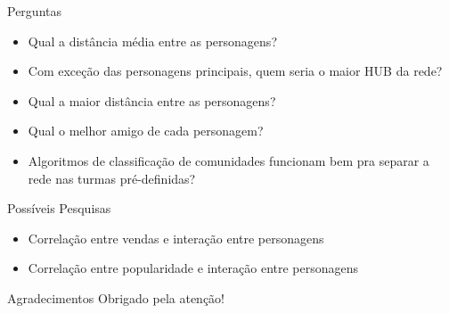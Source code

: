 \documentclass{beamer}
\begin{document}
\begin{frame}{Perguntas}
\begin{itemize}
    \item Qual a distância média entre as personagens?
    \vspace{12pt}
    
    \item Com exceção das personagens principais, quem seria o maior HUB da rede?
    \vspace{12pt}
    
    \item Qual a maior distância entre as personagens?
    \vspace{12pt}
    
    \item Qual o melhor amigo de cada personagem?
    \vspace{12pt}
    
    \item Algoritmos de classificação de comunidades funcionam bem pra separar a rede nas turmas pré-definidas?
\end{itemize}
\end{frame}

\begin{frame}{Possíveis Pesquisas}
\begin{itemize}
    \item Correlação entre vendas e interação entre personagens
    \vspace{12pt}
    
    \item Correlação entre popularidade e interação entre personagens
\end{itemize}
\end{frame}

\begin{frame}{Agradecimentos}
\centering
Obrigado pela atenção!
\end{frame}
\end{document}
